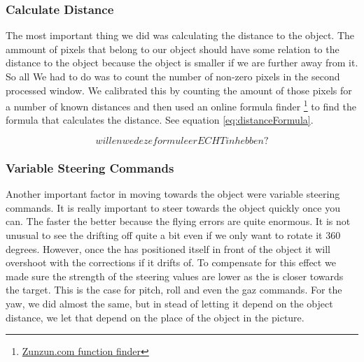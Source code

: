 \subsubsection{Calculate Distance}
The most important thing we did was calculating the distance to the object. The ammount of pixels that belong to our 
object should have some relation to the distance to the object because the object is smaller if we are further away
from it. So all We had to do was to count the number of non-zero pixels in the second processed
window. 
We calibrated this by counting the amount of those pixels for a number of known distances and
then used an online formula finder \footnote{\href{http://zunzun.com/FunctionFinder/2/}{Zunzun.com function finder}} to find the formula 
that calculates the distance. See equation \ref{eq:distanceFormula}.

\begin{equation}
willen we deze formule er ECHT in hebben?
\label{eq:distanceFormula}
\end{equation}

\subsubsection{Variable Steering Commands}
Another important factor in moving towards the object were variable steering commands. 
It is really important to steer towards the object quickly once you can. The faster the 
better because the flying errors are quite enormous. It is not unusual to see the \Ardrone
drifting off quite a bit even if we only want to rotate it 360 degrees. However, once
the \Ardrone has positioned itself in front of the object it will overshoot with the
corrections if it drifts of. To compensate for this effect we made sure the strength
of the steering values are lower as the \Ardrone is closer towards the target. This
is the case for pitch, roll and even the gaz commands. For the yaw, we did
almost the same, but in stead of letting it depend on the object distance, we
let that depend on the place of the object in the picture. 

